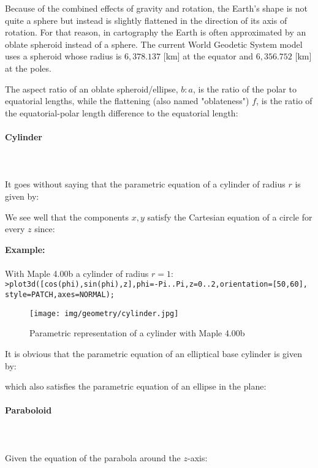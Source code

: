 {	\begin{tcolorbox}[title=Remark,colframe=black,arc=10pt]
	Because of the combined effects of gravity and rotation, the Earth's shape is not quite a sphere but instead is slightly flattened in the direction of its axis of rotation. For that reason, in cartography the Earth is often approximated by an oblate spheroid instead of a sphere. The current World Geodetic System model uses a spheroid whose radius is $6,378.137$ [km] at the equator and $6,356.752$ [km] at the poles.
	\end{tcolorbox}
	The aspect ratio of an oblate spheroid/ellipse, $b : a$, is the ratio of the polar to equatorial lengths, while the flattening (also named "oblateness") $f$, is the ratio of the equatorial-polar length difference to the equatorial length:
	
	
	\pagebreak
	\paragraph{Cylinder}\label{cylinder}\mbox{}\\\\
	It goes without saying that the parametric equation of a cylinder of radius $r$ is given by:
	
	We see well that the components $x, y$ satisfy the Cartesian equation of a circle for every $z$ since:
	
	\begin{tcolorbox}[colframe=black,colback=white,sharp corners]
	\textbf{{\Large {}}Example:}\\\\
	With Maple 4.00b a cylinder of radius $r=1$:\\

	\texttt{>plot3d([cos(phi),sin(phi),z],phi=-Pi..Pi,z=0..2,orientation=[50,60],\\
	style=PATCH,axes=NORMAL);
	}
	\begin{figure}[H]
		\centering
		\texttt{[image: img/geometry/cylinder.jpg]}
		\caption{Parametric representation of a cylinder with Maple 4.00b}
	\end{figure}
	\end{tcolorbox}
	It is obvious that the parametric equation of an elliptical base cylinder is given by:
	
	which also satisfies the parametric equation of an ellipse in the plane:
	
	
	\pagebreak
	\paragraph{Paraboloid}\mbox{}\\\\
	Given the equation of the parabola around the $z$-axis:
	
}
